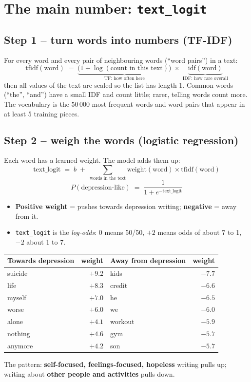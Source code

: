 \documentclass[11pt,a4paper]{article}
\begin{document}
\section{The main number: \texttt{text\_logit}}

\subsection*{Step 1 -- turn words into numbers (TF-IDF)}
For every word and every pair of neighbouring words (``word pairs'') in a text:
\[
\text{tfidf}(\text{word}) \;=\; \underbrace{\bigl(1+\log(\text{count in this text})\bigr)}_{\text{TF: how often here}}
\;\times\; \underbrace{\text{idf}(\text{word})}_{\text{IDF: how rare overall}}
\]
then all values of the text are scaled so the list has length 1. Common words (``the'', ``and'') have a
small IDF and count little; rarer, telling words count more. The vocabulary is the 50\,000 most frequent
words and word pairs that appear in at least 5 training pieces.

\subsection*{Step 2 -- weigh the words (logistic regression)}
Each word has a learned weight. The model adds them up:
\[
\text{text\_logit} \;=\; b \;+\; \sum_{\text{words in the text}} \text{weight}(\text{word}) \times \text{tfidf}(\text{word})
\]
\[
P(\text{depression-like}) \;=\; \frac{1}{1+e^{-\text{text\_logit}}}
\]
\begin{itemize}
\item \textbf{Positive weight} = pushes towards depression writing; \textbf{negative} = away from it.
\item \texttt{text\_logit} is the \emph{log-odds}: 0 means 50/50, $+2$ means odds of about 7 to 1,
      $-2$ about 1 to 7.
\end{itemize}

\begin{center}
\small
\begin{tabular}{@{}lr@{\qquad}lr@{}}
\toprule
\textbf{Towards depression} & \textbf{weight} & \textbf{Away from depression} & \textbf{weight}\\
\midrule
suicide & $+9.2$ & kids & $-7.7$\\
life & $+8.3$ & credit & $-6.6$\\
myself & $+7.0$ & he & $-6.5$\\
worse & $+6.0$ & we & $-6.0$\\
alone & $+4.1$ & workout & $-5.9$\\
nothing & $+4.6$ & gym & $-5.7$\\
anymore & $+4.2$ & son & $-5.7$\\
\bottomrule
\end{tabular}
\end{center}
The pattern: \textbf{self-focused, feelings-focused, hopeless} writing pulls up; writing about
\textbf{other people and activities} pulls down.
\end{document}
